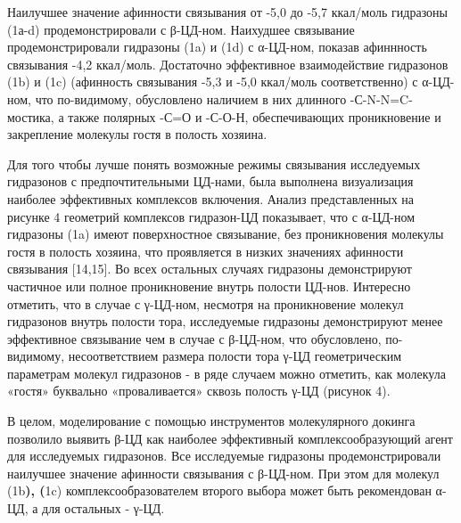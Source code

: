 \begin{multicols}{2}
Наилучшее значение афинности связывания от -5,0 до -5,7 ккал/моль
гидразоны (1а-d) продемонстрировали с β-ЦД-ном. Наихудшее связывание
продемонстрировали гидразоны (1a) и (1d) с α-ЦД-ном,
показав афиннность связывания -4,2 ккал/моль. Достаточно эффективное
взаимодействие гидразонов (1b) и (1c) (афинность связывания
-5,3 и -5,0 ккал/моль соответственно) с α-ЦД-ном, что по-видимому,
обусловлено наличием в них длинного -С-N-N=C- мостика, а также полярных
-С=О и -С-О-Н, обеспечивающих проникновение и закрепление молекулы гостя
в полость хозяина.

Для того чтобы лучше понять возможные режимы связывания исследуемых
гидразонов с предпочтительными ЦД-нами, была выполнена визуализация
наиболее эффективных комплексов включения. Анализ представленных на
рисунке 4 геометрий комплексов гидразон-ЦД показывает, что с α-ЦД-ном
гидразоны (1a) имеют поверхностное связывание, без проникновения
молекулы гостя в полость хозяина, что проявляется в низких значениях
афинности связывания {[}14,15{]}. Во всех остальных случаях гидразоны
демонстрируют частичное или полное проникновение внутрь полости ЦД-нов.
Интересно отметить, что в случае с γ-ЦД-ном, несмотря на проникновение
молекул гидразонов внутрь полости тора, исследуемые гидразоны
демонстрируют менее эффективное связывание чем в случае с β-ЦД-ном, что
обусловлено, по-видимому, несоответствием размера полости тора γ-ЦД
геометрическим параметрам молекул гидразонов - в ряде случаем можно
отметить, как молекула «гостя» буквально «проваливается» сквозь полость
γ-ЦД (рисунок 4).

В целом, моделирование с помощью инструментов молекулярного докинга
позволило выявить β-ЦД как наиболее эффективный комплексообразующий
агент для исследуемых гидразонов. Все исследуемые гидразоны
продемонстрировали наилучшее значение афинности связывания с β-ЦД-ном.
При этом для молекул (1b{\bfseries ), (}1c) комплексообразователем
второго выбора может быть рекомендован α-ЦД, а для остальных - γ-ЦД.
\end{multicols}

